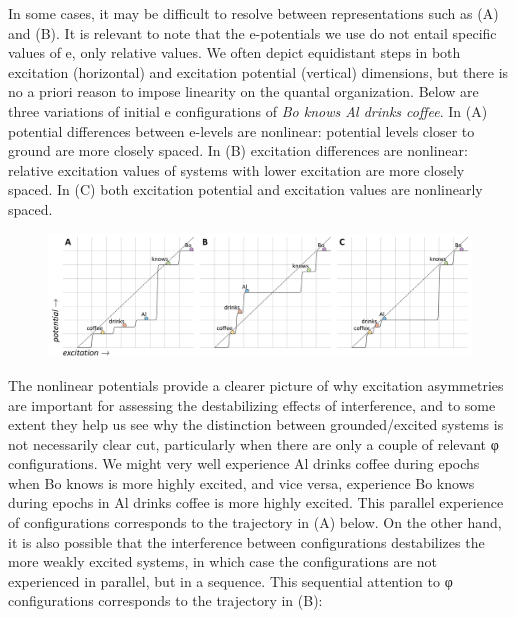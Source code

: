    In some cases, it may be difficult to resolve between representations such as (A) and (B). It is relevant to note that the e-potentials we use do not entail specific values of e, only relative values. We often depict equidistant steps in both excitation (horizontal) and excitation potential (vertical) dimensions, but there is no a priori reason to impose linearity on the quantal organization. Below are three variations of initial e configurations of \textit{Bo knows Al drinks coffee}. In (A) potential differences between e-levels are nonlinear: potential levels closer to ground are more closely spaced. In (B) excitation differences are nonlinear: relative excitation values of systems with lower excitation are more closely spaced. In (C) both excitation potential and excitation values are nonlinearly spaced.

  
\begin{figure}
\includegraphics[width=\textwidth]{figures/Tilsen-img96.png}
\caption{\missingcaption}
\label{fig:}
\end{figure}
   

  The nonlinear potentials provide a clearer picture of why excitation asymmetries are important for assessing the destabilizing effects of interference, and to some extent they help us see why the distinction between grounded/excited systems is not necessarily clear cut, particularly when there are only a couple of relevant φ configurations. We might very well experience {\textbar}Al drinks coffee{\textbar} during epochs when {\textbar}Bo knows{\textbar} is more highly excited, and vice versa, experience {\textbar}Bo knows{\textbar} during epochs in {\textbar}Al drinks coffee{\textbar} is more highly excited. This parallel experience of configurations corresponds to the trajectory in (A) below. On the other hand, it is also possible that the interference between configurations destabilizes the more weakly excited systems, in which case the configurations are not experienced in parallel, but in a sequence. This sequential attention to φ configurations corresponds to the trajectory in (B):

